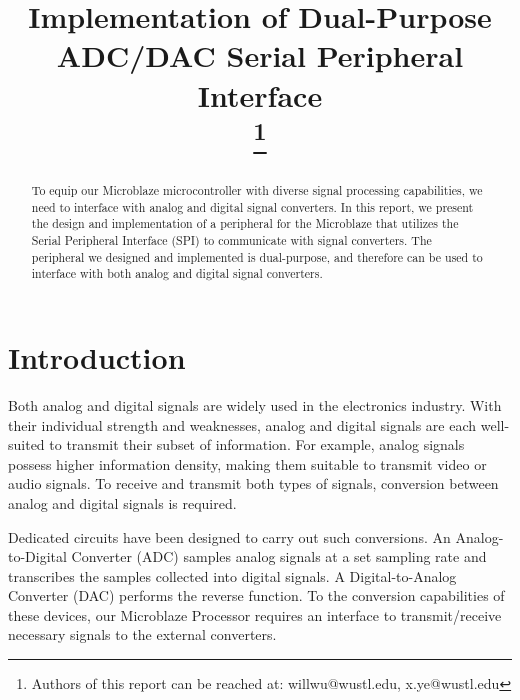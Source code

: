 \documentclass[conference]{IEEEtran}
\begin{document}
\title{Implementation of Dual-Purpose ADC/DAC Serial Peripheral Interface\\
{\footnotesize \textsuperscript{}
\thanks{Authors of this report can be reached at: willwu{@}wustl.edu, x.ye@wustl.edu}
}}

\author{
}

\maketitle

\begin{abstract}
To equip our Microblaze\textregistered{} microcontroller with diverse signal processing capabilities, we need to interface with analog and digital signal converters. In this report, we present the design and implementation of a peripheral for the Microblaze \textregistered{} that utilizes the Serial Peripheral Interface (SPI) to communicate with signal converters. The peripheral we designed and implemented is dual-purpose, and therefore can be used to interface with both analog and digital signal converters.
\end{abstract}

\section{Introduction} \label{introduction}

Both analog and digital signals are widely used in the electronics industry. With their individual strength and weaknesses, analog and digital signals are each well-suited to transmit their subset of information. For example, analog signals possess higher information density, making them suitable to transmit video or audio signals. To receive and transmit both types of signals, conversion between analog and digital signals is required. 

Dedicated circuits have been designed to carry out such conversions. An Analog-to-Digital Converter (ADC) samples analog signals at a set sampling rate and transcribes the samples collected into digital signals. A Digital-to-Analog Converter (DAC) performs the reverse function. To the conversion capabilities of these devices, our Microblaze \textregistered{} Processor requires an interface to transmit/receive necessary signals to the external converters. 
\end{document}
